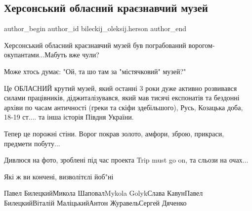  
 
 
 
 
 
\subsection{Херсонський обласний краєзнавчий музей}
\label{sec:18_11_2022.fb.bileckij_oleksij.herson.1.muzej}
 
\ifcmt
 author_begin
   author_id bileckij_oleksij.herson
 author_end
\fi

Херсонський обласний краєзнавчий музей був пограбований
ворогом-окупантами...Мабуть вже чули?

Може хтось думає: "Ой, та шо там за "містячковий" музей?"

Це ОБЛАСНИЙ крутий музей, який останні 3 роки дуже активно розвивався силами
працівників, діджиталізувався, який мав тисячі експонатів та бездонні архіви по
часам античності (греки та скіфи здебільшого), Русь, Козацька доба, 18-19
ст.... та інша історія Півдня України. 

Тепер це порожні стіни. Ворог покрав золото, амфори, зброю, прикраси, предмети
побуту... 

Дивлюся на фото, зроблені під час проекта Trip must go on, та сльози на очах...

Які ж ви кончені, визволітєлі йоб"ні

Павел БилецкийМикола ШаповалMykola GolykСлава КавунПавел БилецкийВіталій
МаліцькийАнтон ЖуравельСергей Дяченко

